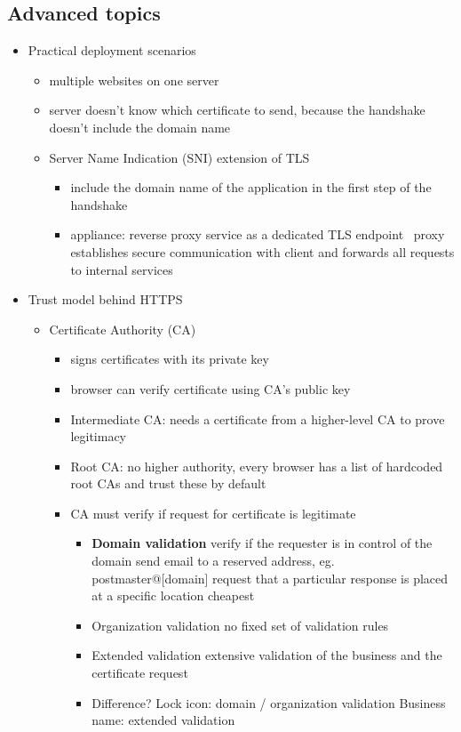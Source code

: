 \documentclass[12pt,titlepage,a4paper]{report}
\begin{document}
	\subsection{Advanced topics}
	\begin{itemize}
		\item Practical deployment scenarios
		\begin{itemize}
			\item multiple websites on one server
			\item server doesn't know which certificate to send, because the handshake doesn't include the domain name
			\item Server Name Indication (SNI) extension of TLS
			\begin{itemize}
				\item include the domain name of the application in the first step of the handshake
				\item appliance: reverse proxy service as a dedicated TLS endpoint \textrightarrow \, proxy establishes secure communication with client and forwards all requests to internal services
			\end{itemize}
		\end{itemize}
	
		\item Trust model behind HTTPS
		\begin{itemize}
			\item Certificate Authority (CA)
			\begin{itemize}
				\item signs certificates with its private key
				\item browser can verify certificate using CA's public key
				\item Intermediate CA: needs a certificate from a higher-level CA to prove legitimacy
				\item Root CA: no higher authority, every browser has a list of hardcoded root CAs and trust these by default
				\item CA must verify if request for certificate is legitimate
				\begin{itemize}
					\item \textbf{Domain validation} verify if the requester is in control of the domain
						\subitem send email to a reserved address, eg. postmaster@[domain]
						\subitem request that a particular response is placed at a specific location
						\subitem cheapest
					\item Organization validation
						\subitem no fixed set of validation rules
					\item Extended validation
						\subitem extensive validation of the business and the certificate request
					\item Difference?
						\subitem Lock icon: domain / organization validation
						\subitem Business name: extended validation
				\end{itemize}
			\end{itemize}
		\end{itemize}
		

\end{itemize}
\end{document}
